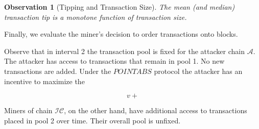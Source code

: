 \documentclass[11pt]{article}
\theoremstyle{plain}
\newtheorem{observation}{Observation}[section]
\begin{document}
\begin{observation}[Tipping and Transaction Size]
\label{obs:Tipping and Transaction Size}  
The mean (and median) transaction tip is a monotone function of transaction size.
\end{observation}

Finally, we evaluate the miner's decision to order transactions onto blocks.


Observe that in interval 2 the transaction pool is fixed for the attacker chain $\mathcal{A}$. The attacker has access to transactions that remain in pool 1. No new transactions are added. Under the $POINTABS$ protocol the attacker has an incentive to maximize the 

\begin{equation}
\label{eq: attacker's profit function}
v + 
\end{equation}


Miners of chain $\mathcal{IC}$, on the other hand, have additional access to transactions placed in pool 2 over time. Their overall pool is unfixed. 
\end{document}
